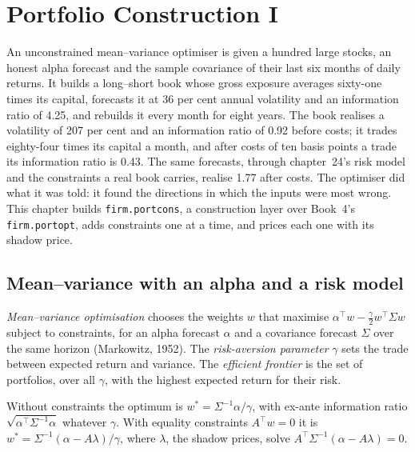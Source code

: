\chapter{Portfolio Construction I}\label{ch:rs:portfolio-construction-i}

An unconstrained mean--variance optimiser is given a hundred large stocks, an honest alpha forecast and the sample covariance of their last six months of daily
returns. It builds a long--short book whose gross exposure averages sixty-one times its capital, forecasts it at 36 per cent annual volatility and an
information ratio of 4.25, and rebuilds it every month for eight years. The book realises a volatility of 207 per cent and an information ratio of 0.92 before
costs; it trades eighty-four times its capital a month, and after costs of ten basis points a trade its information ratio is 0.43. The same forecasts, through
chapter~24's risk model and the constraints a real book carries, realise 1.77 after costs. The optimiser did what it was told: it found the directions in which
the inputs were most wrong. This chapter builds \texttt{firm.portcons}, a construction layer over Book~4's \texttt{firm.portopt}, adds constraints one at a time,
and prices each one with its shadow price.

\section{Mean--variance with an alpha and a risk model}

\begin{definition}\label{def:rs:portfolio-construction-i:mv}
\emph{Mean--variance optimisation} chooses the weights $w$ that maximise $\alpha^\top w - \frac{\gamma}{2} w^\top\Sigma w$
subject to constraints, for an alpha forecast $\alpha$ and a covariance forecast $\Sigma$ over the same horizon (Markowitz, 1952). The
\emph{risk-aversion parameter} $\gamma$ sets the trade between expected return and variance. The \emph{efficient
frontier} is the set of portfolios, over all $\gamma$, with the highest expected return for their risk.
\end{definition}

\begin{proposition}\label{prop:rs:portfolio-construction-i:mv}
Without constraints the optimum is $w^* = \Sigma^{-1}\alpha/\gamma$, with ex-ante information ratio $\sqrt{\alpha^\top\Sigma^{-1}\alpha}$ whatever $\gamma$. With
equality constraints $A^\top w = 0$ it is $w^* = \Sigma^{-1}(\alpha - A\lambda)/\gamma$, where $\lambda$, the shadow prices, solve $A^\top\Sigma^{-1}(\alpha - A\lambda) = 0$.
\end{proposition}

